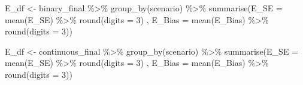 \documentclass[
]{article}
\newenvironment{Shaded}{\begin{snugshade}}{\end{snugshade}}
\newcommand{\AttributeTok}[1]{\textcolor[rgb]{0.77,0.63,0.00}{#1}}
\newcommand{\DecValTok}[1]{\textcolor[rgb]{0.00,0.00,0.81}{#1}}
\newcommand{\FunctionTok}[1]{\textcolor[rgb]{0.00,0.00,0.00}{#1}}
\newcommand{\NormalTok}[1]{#1}
\newcommand{\OtherTok}[1]{\textcolor[rgb]{0.56,0.35,0.01}{#1}}
\newcommand{\SpecialCharTok}[1]{\textcolor[rgb]{0.00,0.00,0.00}{#1}}
\begin{document}
\begin{Shaded}
\begin{Highlighting}[]
\NormalTok{E\_df }\OtherTok{\textless{}{-}}
\NormalTok{  binary\_final }\SpecialCharTok{\%\textgreater{}\%} 
  \FunctionTok{group\_by}\NormalTok{(scenario) }\SpecialCharTok{\%\textgreater{}\%} 
  \FunctionTok{summarise}\NormalTok{(}\AttributeTok{E\_SE =} \FunctionTok{mean}\NormalTok{(E\_SE) }\SpecialCharTok{\%\textgreater{}\%} \FunctionTok{round}\NormalTok{(}\AttributeTok{digits =} \DecValTok{3}\NormalTok{) , }
            \AttributeTok{E\_Bias =} \FunctionTok{mean}\NormalTok{(E\_Bias) }\SpecialCharTok{\%\textgreater{}\%} \FunctionTok{round}\NormalTok{(}\AttributeTok{digits =} \DecValTok{3}\NormalTok{))}

\NormalTok{E\_df }\OtherTok{\textless{}{-}}
\NormalTok{  continuous\_final }\SpecialCharTok{\%\textgreater{}\%} 
  \FunctionTok{group\_by}\NormalTok{(scenario) }\SpecialCharTok{\%\textgreater{}\%} 
  \FunctionTok{summarise}\NormalTok{(}\AttributeTok{E\_SE =} \FunctionTok{mean}\NormalTok{(E\_SE) }\SpecialCharTok{\%\textgreater{}\%} \FunctionTok{round}\NormalTok{(}\AttributeTok{digits =} \DecValTok{3}\NormalTok{) , }
            \AttributeTok{E\_Bias =} \FunctionTok{mean}\NormalTok{(E\_Bias) }\SpecialCharTok{\%\textgreater{}\%} \FunctionTok{round}\NormalTok{(}\AttributeTok{digits =} \DecValTok{3}\NormalTok{))}
\end{Highlighting}
\end{Shaded}
\end{document}
